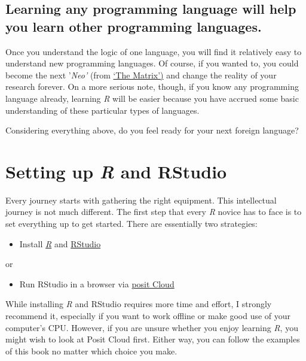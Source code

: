 \documentclass[
  letterpaper,
  DIV=11,
  numbers=noendperiod]{scrreprt}
\providecommand{\tightlist}{%
  \setlength{\itemsep}{0pt}\setlength{\parskip}{0pt}}\usepackage{longtable,booktabs,array}
\begin{document}
\section{Learning any programming language will help you learn other
programming
languages.}\label{sec-learning-any-programming-language-will-help-you-learn-other-programming-languages.}

Once you understand the logic of one language, you will find it
relatively easy to understand new programming languages. Of course, if
you wanted to, you could become the next '\emph{Neo'} (from
\href{https://www.imdb.com/title/tt0133093/?ref_=ext_shr_lnk}{`The
Matrix')} and change the reality of your research forever. On a more
serious note, though, if you know any programming language already,
learning \emph{R} will be easier because you have accrued some basic
understanding of these particular types of languages.

Considering everything above, do you feel ready for your next foreign
language?


\chapter{\texorpdfstring{Setting up \emph{R} and
RStudio}{Setting up R and RStudio}}\label{sec-setting-up-r-and-rstudio}

Every journey starts with gathering the right equipment. This
intellectual journey is not much different. The first step that every
\emph{R} novice has to face is to set everything up to get started.
There are essentially two strategies:

\begin{itemize}
\tightlist
\item
  Install \href{https://www.r-project.org}{\emph{R}} and
  \href{https://www.rstudio.com}{RStudio}
\end{itemize}

or

\begin{itemize}
\tightlist
\item
  Run RStudio in a browser via \href{https://rstudio.cloud}{posit Cloud}
\end{itemize}

While installing \emph{R} and RStudio requires more time and effort, I
strongly recommend it, especially if you want to work offline or make
good use of your computer's CPU. However, if you are unsure whether you
enjoy learning \emph{R}, you might wish to look at Posit Cloud first.
Either way, you can follow the examples of this book no matter which
choice you make.
\end{document}

